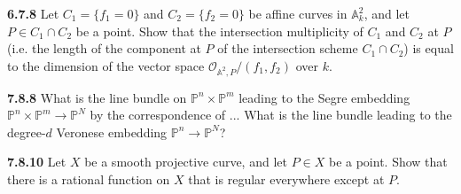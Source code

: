 \documentclass[11pt,letterpaper]{report}
\newcommand{\mcal}[1]{\mathcal{#1}}
\newcommand{\affine}{\mathbb{A}}
\newcommand{\projective}{\mathbb{P}}
\begin{document}
\noindent\textbf{6.7.8}
Let $C_1 = \{f_1=0\}$ and $C_2 = \{f_2 = 0\}$ be affine curves in $\affine_k^2$, and let $P\in C_1\cap C_2$ be a point. Show that the intersection multiplicity of $C_1$ and $C_2$ at $P$ (i.e. the length of the component at $P$ of the intersection scheme $C_1\cap C_2$) is equal to the dimension of the vector space $\mcal{O}_{\affine^2, P}/(f_1, f_2)$ over $k$.

\noindent\textbf{7.8.8}
What is the line bundle on $\projective^n\times \projective^m$ leading to the Segre embedding $\projective^n\times \projective^m\to \projective^N$ by the correspondence of ... What is the line bundle leading to the degree-$d$ Veronese embedding $\projective^n\to \projective^N$?


\noindent\textbf{7.8.10}
Let $X$ be a smooth projective curve, and let $P\in X$ be a point. Show that there is a rational function on $X$ that is regular everywhere except at $P$.
\end{document}
